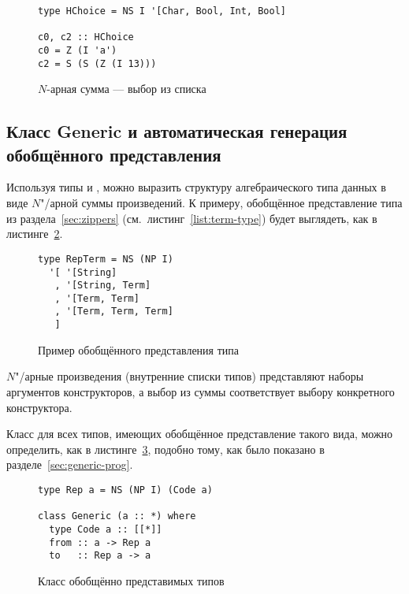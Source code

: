 \begin{figure}[h]
\begin{framed}
\vspace{-0.25cm}
\begin{lstlisting}
type HChoice = NS I '[Char, Bool, Int, Bool]

c0, c2 :: HChoice
c0 = Z (I 'a')
c2 = S (S (Z (I 13)))
\end{lstlisting}
\vspace{-0.25cm}
\end{framed}
\caption{$N$-арная сумма --- выбор из списка}
\label{list:ns-example}
\end{figure}

\subsection{Класс \textsf{Generic} и автоматическая генерация обобщённого представления}

Используя типы  и , можно выразить структуру алгебраического типа данных в виде $N$"/арной суммы произведений. К примеру, обобщённое представление типа  из раздела~\ref{sec:zippers} (см.~листинг~\ref{list:term-type}) будет выглядеть, как в листинге~\ref{list:rep-term}.
\begin{figure}[h]
\begin{framed}
\vspace{-0.25cm}
\begin{lstlisting}
type RepTerm = NS (NP I)
  '[ '[String]
   , '[String, Term]
   , '[Term, Term]
   , '[Term, Term, Term]
   ]
\end{lstlisting}
\vspace{-0.25cm}
\end{framed}
\caption{Пример обобщённого представления типа}
\label{list:rep-term}
\end{figure}

$N$"/арные произведения (внутренние списки типов) представляют наборы аргументов конструкторов, а выбор из суммы соответствует выбору конкретного конструктора.

Класс  для всех типов, имеющих обобщённое представление такого вида, можно определить, как в листинге~\ref{list:generic-sop}, подобно тому, как было показано в разделе~\ref{sec:generic-prog}.
\begin{figure}[h]
\begin{framed}
\vspace{-0.25cm}
\begin{lstlisting}
type Rep a = NS (NP I) (Code a)

class Generic (a :: *) where
  type Code a :: [[*]]  
  from :: a -> Rep a
  to   :: Rep a -> a
\end{lstlisting}
\vspace{-0.25cm}
\end{framed}
\caption{Класс обобщённо представимых типов}
\label{list:generic-sop}
\end{figure}


